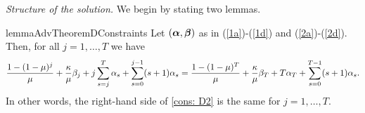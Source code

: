     \emph{Structure of the solution.}
    We begin by stating two lemmas.


\begin{restatable}{lemma}{AdvTheoremDConstraints}
    \label{lemma: AdvTheoremDConstraints}
    Let $(\bm{\alpha}, \bm{\beta})$ as in (\ref{1a})-(\ref{1d}) and (\ref{2a})-(\ref{2d}).
    Then, for all $j = 1, \ldots, T$ we have
    \begin{equation*}
        \frac{1- (1-\mu)^j}{\mu} + \frac{\kappa}{\mu} \beta_j + j \sum_{s=j}^{T} \alpha_s + \sum_{s=0}^{j-1} (s+1) \alpha_s = \frac{1- (1-\mu)^T}{\mu} + \frac{\kappa}{\mu} \beta_T + T \alpha_T + \sum_{s=0}^{T-1} (s+1) \alpha_s.
    \end{equation*}
    In other words, the right-hand side of \ref{cons: D2} is the same for $j=1,\ldots,T$.
\end{restatable}


